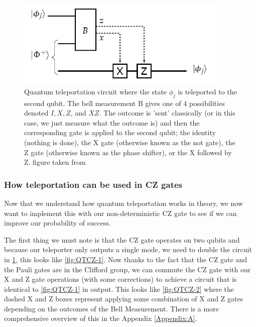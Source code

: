 \begin{figure}[h]
    \centering
    \includegraphics[width=0.9\textwidth]{images/QT circuit.png}
    \caption{Quantum teleportation circuit where the state $\phi_j$ is teleported to the second qubit. The bell measurement B gives one of 4 possibilities denoted $I, X, Z$, and $XZ$. The outcome is 'sent' classically (or in this case, we just measure what the outcome is) and then the corresponding gate is applied to the second qubit; the identity (nothing is done), the X gate (otherwise known as the not gate), the Z gate (otherwise known as the phase shifter), or the X followed by Z. figure taken from \cite{Kok:2005jip}}\label{fig:QT circuit}
\end{figure}

\subsubsection{How teleportation can be used in CZ gates}
Now that we understand how quantum teleportation works in theory, we now want to implement this with our non-deterministic CZ gate to see if we can improve our probability of success.

The first thing we must note is that the CZ gate operates on two qubits and because our teleporter only outputs a single mode, we need to double the circuit in \cref{fig:QT circuit}, this looks like \cref{fig:QTCZ-1}. Now thanks to the fact that the CZ gate and the Pauli gates are in the Clifford group, we can commute the CZ gate with our X and Z gate operations \cite{GottesmanDaniel1999QTia}(with some corrections) to achieve a circuit that is identical to \cref{fig:QTCZ-1} in output. This looks like \cref{fig:QTCZ-2} where the dashed X and Z boxes represent applying some combination of X and Z gates depending on the outcomes of the Bell Measurement. There is a more comprehensive overview of this in the Appendix \ref{Appendix:A}. 

